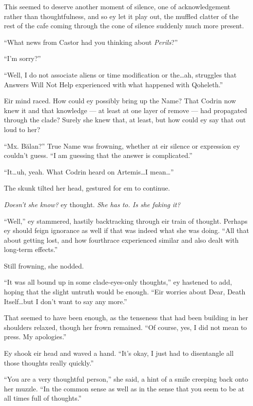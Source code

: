 This seemed to deserve another moment of silence, one of acknowledgement rather than thoughtfulness, and so ey let it play out, the muffled clatter of the rest of the cafe coming through the cone of silence suddenly much more present.

``What news from Castor had you thinking about \emph{Perils}?''

``I'm sorry?''

``Well, I do not associate aliens or time modification or the\ldots ah, struggles that Answers Will Not Help experienced with what happened with Qoheleth.''

Eir mind raced. How could ey possibly bring up the Name? That Codrin now knew it and that knowledge — at least at one layer of remove — had propagated through the clade? Surely she knew that, at least, but how could ey say that out loud to her?

``Mx. Bălan?'' True Name was frowning, whether at eir silence or expression ey couldn't guess. ``I am guessing that the answer is complicated.''

``It\ldots uh, yeah. What Codrin heard on Artemis\ldots I mean\ldots{}''

The skunk tilted her head, gestured for em to continue.

\emph{Doesn't she know?} ey thought. \emph{She has to. Is she faking it?}

``Well,'' ey stammered, hastily backtracking through eir train of thought. Perhaps ey should feign ignorance as well if that was indeed what she was doing. ``All that about getting lost, and how fourthrace experienced similar and also dealt with long-term effects.''

Still frowning, she nodded.

``It was all bound up in some clade-eyes-only thoughts,'' ey hastened to add, hoping that the slight untruth would be enough. ``Eir worries about Dear, Death Itself\ldots but I don't want to say any more.''

That seemed to have been enough, as the tenseness that had been building in her shoulders relaxed, though her frown remained. ``Of course, yes, I did not mean to press. My apologies.''

Ey shook eir head and waved a hand. ``It's okay, I just had to disentangle all those thoughts really quickly.''

``You are a very thoughtful person,'' she said, a hint of a smile creeping back onto her muzzle. ``In the common sense as well as in the sense that you seem to be at all times full of thoughts.''

